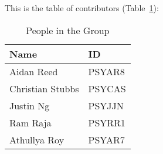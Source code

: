 This is the table of contributors (Table~\ref{authors}):
\begin{table}%
\centering
\caption{People in the Group}
\label{authors}
\begin{tabular}{|l|l|}
\hline
\textbf{Name} & \textbf{ID} \\
\hline
Aidan Reed & PSYAR8 \\
\hline
Christian Stubbs & PSYCAS\\
\hline
Justin Ng & PSYJJN \\
\hline
Ram Raja & PSYRR1\\
\hline
Athullya Roy & PSYAR7 \\
\hline
\end{tabular}
\end{table}